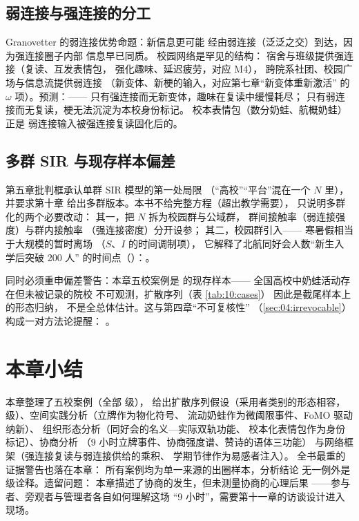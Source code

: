 \subsection{弱连接与强连接的分工}

Granovetter 的弱连接优势命题：新信息更可能
经由弱连接（泛泛之交）到达，因为强连接圈子内部
信息早已同质\cite{granovetter1973weak}。
校园网络是罕见的结构：
宿舍与班级提供强连接（复读、互发表情包，
强化趣味、延迟疲劳，对应 M4），
跨院系社团、校园广场与信息流提供弱连接
（新变体、新梗的输入，对应第七章“新变体重新激活”
的 $\omega$ 项）。预测：——
只有强连接而无新变体，趣味在复读中缓慢耗尽；
只有弱连接而无复读，梗无法沉淀为本校身份标记。
校本表情包（数分奶蛙、航概奶蛙）正是
弱连接输入被强连接复读固化后的。

\subsection{多群 SIR 与现存样本偏差}

第五章批判框承认单群 SIR 模型的第一处局限
（“高校”“平台”混在一个 $N$ 里），并要求第十章
给出多群版本。本书不给完整方程（超出教学需要），
只说明多群化的两个必要改动：
其一，把 $N$ 拆为校园群与公域群，
群间接触率（弱连接强度）与群内接触率
（强连接密度）分开设参；
其二，校园群引入——
寒暑假相当于大规模的暂时离场
（$S$、$I$ 的时间调制项），
它解释了北航同好会人数“新生入学后突破 200 人”
的时间点（）：。

同时必须重申偏差警告：本章五校案例是
的现存样本——
全国高校中奶蛙活动存在但未被记录的院校
不可观测，扩散序列（表 \ref{tab:10:cases}）
因此是截尾样本上的形态归纳，
不是全总体估计。这与第四章“不可复核性”
（\ref{sec:04:irrevocable}）构成一对方法论提醒：
。

\section{本章小结}\label{sec:10:summary}

本章整理了五校案例（全部  级），
给出扩散序列假设（采用者类别的形态相容，
 级）、空间实践分析（立牌作为物化符号、
流动奶蛙作为微阈限事件、FoMO 驱动纳新）、
组织形态分析（同好会的名义—实际双轨功能、
校本化表情包作为身份标记）、协商分析
（9 小时立牌事件、协商强度谱、赞诗的语体三功能）
与网络框架（强连接复读与弱连接供给的乘积、
学期节律作为易感者注入）。
全书最重的证据警告也落在本章：
所有案例均为单一来源的出圈样本，分析结论
无一例外是  级诠释。遗留问题：
本章描述了协商的发生，但未测量协商的心理后果
——参与者、旁观者与管理者各自如何理解这场
“9 小时”，需要第十一章的访谈设计进入现场。

